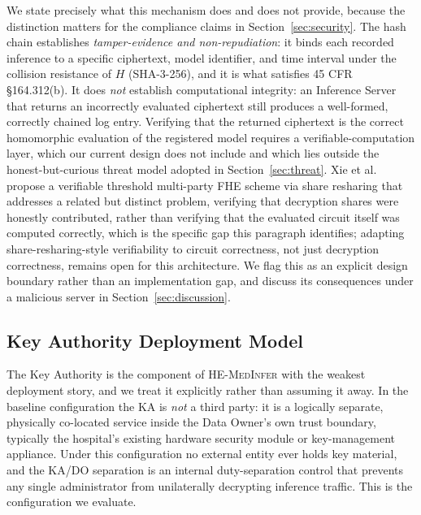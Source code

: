 \documentclass[journal,compsoc]{IEEEtran}
\newcommand{\framework}{\textsc{HE-MedInfer}}
\begin{document}
We state precisely what this mechanism does and does not provide, because the
distinction matters for the compliance claims in Section~\ref{sec:security}.
The hash chain establishes \emph{tamper-evidence and non-repudiation}: it binds
each recorded inference to a specific ciphertext, model identifier, and time
interval under the collision resistance of $H$ (SHA-3-256), and it is what
satisfies 45 CFR \S164.312(b). It does \emph{not} establish computational
integrity: an Inference Server that returns an incorrectly evaluated ciphertext
still produces a well-formed, correctly chained log entry. Verifying that the
returned ciphertext is the correct homomorphic evaluation of the registered
model requires a verifiable-computation layer, which our current design does
not include and which lies outside the honest-but-curious threat model adopted
in Section~\ref{sec:threat}. Xie et al.~\cite{xie2025verifiablethreshold}
propose a verifiable threshold multi-party FHE scheme via share resharing
that addresses a related but distinct problem, verifying that decryption
shares were honestly contributed, rather than verifying that the evaluated
circuit itself was computed correctly, which is the specific gap this
paragraph identifies; adapting share-resharing-style verifiability to
circuit correctness, not just decryption correctness, remains open for this
architecture. We flag this as an explicit design boundary rather
than an implementation gap, and discuss its consequences under a malicious
server in Section~\ref{sec:discussion}.

\subsection{Key Authority Deployment Model}
\label{sec:ka}

The Key Authority is the component of \framework{} with the weakest deployment
story, and we treat it explicitly rather than assuming it away. In the baseline
configuration the KA is \emph{not} a third party: it is a logically separate,
physically co-located service inside the Data Owner's own trust boundary,
typically the hospital's existing hardware security module or key-management
appliance. Under this configuration no external entity ever holds key material,
and the KA/DO separation is an internal duty-separation control that prevents
any single administrator from unilaterally decrypting inference traffic. This
is the configuration we evaluate.
\end{document}

